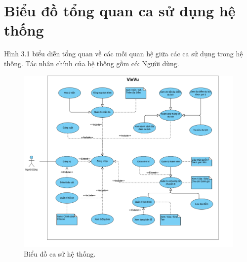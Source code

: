 \section{Biểu đồ tổng quan ca sử dụng hệ thống}
Hình 3.1 biểu diễn tổng quan về các mối quan hệ giữa các ca sử dụng trong hệ
thống. Tác nhân chính của hệ thống gồm có: Người dùng.
\begin{figure}[H]
    \centering
    \includegraphics[width=1.1\textwidth]{figures/c3/3-2-usecases.png}
    \caption{Biểu đồ ca sử hệ thống.}
    \label{fig:3-2-usecases}
\end{figure}